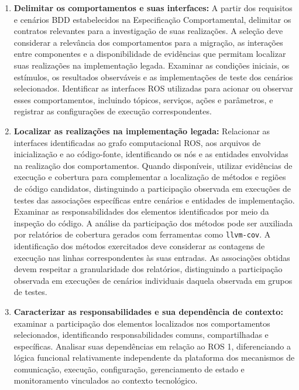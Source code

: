 \begin{enumerate}


    \item \textbf{Delimitar os comportamentos e suas interfaces:} A partir dos requisitos e cenários BDD estabelecidos na Especificação Comportamental, delimitar os contratos relevantes para a investigação de suas realizações. A seleção deve considerar a relevância dos comportamentos para a migração, as interações entre componentes e a disponibilidade de evidências que permitam localizar suas realizações na implementação legada. Examinar as condições iniciais, os estímulos, os resultados observáveis e as implementações de teste dos cenários selecionados. Identificar as interfaces ROS utilizadas para acionar ou observar esses comportamentos, incluindo tópicos, serviços, ações e parâmetros, e registrar as configurações de execução correspondentes.


    
    \item \textbf{Localizar as realizações na implementação legada:} Relacionar as interfaces identificadas ao grafo computacional ROS, aos arquivos de inicialização e ao código-fonte, identificando os nós e as entidades envolvidas na realização dos comportamentos. Quando disponíveis, utilizar evidências de execução e cobertura para complementar a localização de métodos e regiões de código candidatos, distinguindo a participação observada em execuções de testes das associações específicas entre cenários e entidades de implementação. Examinar as responsabilidades dos elementos identificados por meio da inspeção do código. A análise da participação dos métodos pode ser auxiliada por relatórios de cobertura gerados com ferramentas como \texttt{llvm-cov}. A identificação dos métodos exercitados deve considerar as contagens de execução nas linhas correspondentes às suas entradas. As associações obtidas devem respeitar a granularidade dos relatórios, distinguindo a participação observada em execuções de cenários individuais daquela observada em grupos de testes.


    \item \textbf{Caracterizar as responsabilidades
    e sua dependência de contexto:}
    examinar a participação dos elementos
    localizados nos comportamentos selecionados,
    identificando responsabilidades comuns,
    compartilhadas e específicas. Analisar suas
    dependências em relação ao ROS 1, diferenciando
    a lógica funcional relativamente independente
    da plataforma dos mecanismos de comunicação,
    execução, configuração, gerenciamento de
    estado e monitoramento vinculados ao contexto
    tecnológico. 


\end{enumerate}
